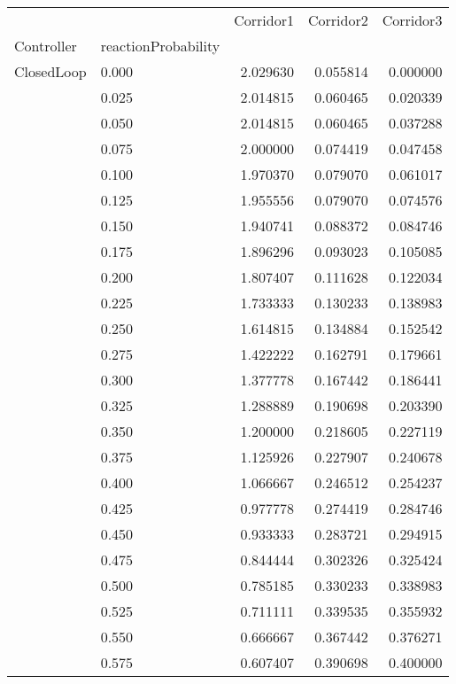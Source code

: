 \begin{tabular}{llrrr}
\toprule
         &       &  Corridor1 &  Corridor2 &  Corridor3 \\
Controller & reactionProbability &            &            &            \\
\midrule
ClosedLoop & 0.000 &   2.029630 &   0.055814 &   0.000000 \\
         & 0.025 &   2.014815 &   0.060465 &   0.020339 \\
         & 0.050 &   2.014815 &   0.060465 &   0.037288 \\
         & 0.075 &   2.000000 &   0.074419 &   0.047458 \\
         & 0.100 &   1.970370 &   0.079070 &   0.061017 \\
         & 0.125 &   1.955556 &   0.079070 &   0.074576 \\
         & 0.150 &   1.940741 &   0.088372 &   0.084746 \\
         & 0.175 &   1.896296 &   0.093023 &   0.105085 \\
         & 0.200 &   1.807407 &   0.111628 &   0.122034 \\
         & 0.225 &   1.733333 &   0.130233 &   0.138983 \\
         & 0.250 &   1.614815 &   0.134884 &   0.152542 \\
         & 0.275 &   1.422222 &   0.162791 &   0.179661 \\
         & 0.300 &   1.377778 &   0.167442 &   0.186441 \\
         & 0.325 &   1.288889 &   0.190698 &   0.203390 \\
         & 0.350 &   1.200000 &   0.218605 &   0.227119 \\
         & 0.375 &   1.125926 &   0.227907 &   0.240678 \\
         & 0.400 &   1.066667 &   0.246512 &   0.254237 \\
         & 0.425 &   0.977778 &   0.274419 &   0.284746 \\
         & 0.450 &   0.933333 &   0.283721 &   0.294915 \\
         & 0.475 &   0.844444 &   0.302326 &   0.325424 \\
         & 0.500 &   0.785185 &   0.330233 &   0.338983 \\
         & 0.525 &   0.711111 &   0.339535 &   0.355932 \\
         & 0.550 &   0.666667 &   0.367442 &   0.376271 \\
         & 0.575 &   0.607407 &   0.390698 &   0.400000 \\

\end{tabular}
